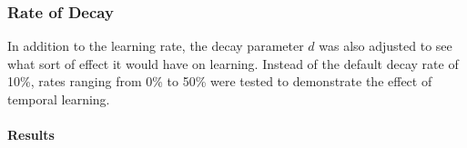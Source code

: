 
\subsubsection*{Rate of Decay}
\label{sec:findings-expts-decay}

In addition to the learning rate,
the decay parameter $d$ was also adjusted to see what sort of effect it
would have on learning.
%
Instead of the default decay rate of 10\%,
rates ranging from 0\% to 50\%
were tested to demonstrate the effect of temporal learning.

\paragraph*{Results}

